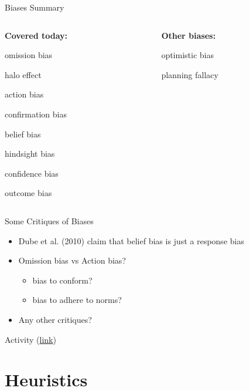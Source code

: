 \documentclass[
  ignorenonframetext,
]{beamer}
\providecommand{\tightlist}{%
  \setlength{\itemsep}{0pt}\setlength{\parskip}{0pt}}\usepackage{longtable,booktabs,array}
\begin{document}
\begin{frame}{Biases Summary}
\protect\hypertarget{biases-summary}{}
\begin{columns}[T]
\begin{column}{0.5\textwidth}
\textbf{Covered today:}

omission bias

halo effect

action bias

confirmation bias

belief bias

hindsight bias

confidence bias

outcome bias
\end{column}

\begin{column}{0.5\textwidth}
\textbf{Other biases:}

optimistic bias

planning fallacy
\end{column}
\end{columns}
\end{frame}

\begin{frame}{Some Critiques of Biases}
\protect\hypertarget{some-critiques-of-biases}{}
\begin{itemize}
\item
  Dube et al. (2010) claim that belief bias is just a response bias
\item
  Omission bias vs Action bias?

  \begin{itemize}
  \tightlist
  \item
    bias to conform?
  \item
    bias to adhere to norms?
  \end{itemize}
\item
  Any other critiques?
\end{itemize}
\end{frame}

\begin{frame}{Activity
(\href{https://docs.google.com/document/d/1ap7xShuXe9tIzDQOky54idFdKo3teKMHsJtClSxKUGg/edit?usp=sharing}{link})}
\protect\hypertarget{activity-link}{}
\end{frame}

\hypertarget{heuristics}{%
\section{Heuristics}\label{heuristics}}
\end{document}
